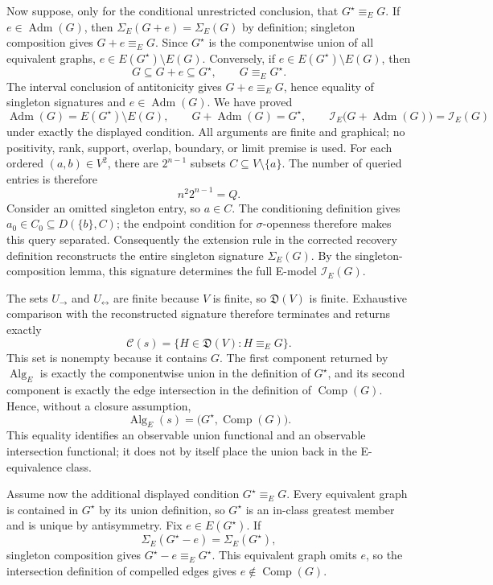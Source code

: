 Now suppose, only for the conditional unrestricted conclusion, that \(G^\star\equiv_EG\).  If \(e\in\operatorname{Adm}(G)\), then \(\Sigma_E(G+e)=\Sigma_E(G)\) by definition; singleton composition gives \(G+e\equiv_EG\).  Since \(G^\star\) is the componentwise union of all equivalent graphs, \(e\in E(G^\star)\setminus E(G)\).  Conversely, if \(e\in E(G^\star)\setminus E(G)\), then
\[
 G\subseteq G+e\subseteq G^\star,
 \qquad G\equiv_EG^\star.
\]
The interval conclusion of antitonicity gives \(G+e\equiv_EG\), hence equality of singleton signatures and \(e\in\operatorname{Adm}(G)\).  We have proved
\[
 \operatorname{Adm}(G)=E(G^\star)\setminus E(G),
 \qquad
 G+\operatorname{Adm}(G)=G^\star,
 \qquad
 \mathcal I_E\bigl(G+\operatorname{Adm}(G)\bigr)=\mathcal I_E(G)
\]
under exactly the displayed condition.  All arguments are finite and graphical; no positivity, rank, support, overlap, boundary, or limit premise is used.
For each ordered \((a,b)\in V^2\), there are \(2^{n-1}\) subsets \(C\subseteq V\setminus\{a\}\).  The number of queried entries is therefore
\[
 n^2 2^{n-1}=Q.
\]
Consider an omitted singleton entry, so \(a\in C\).  The conditioning definition gives \(a_0\in C_0\subseteq D(\{b\},C)\); the endpoint condition for \(\sigma\)-openness therefore makes this query separated.  Consequently the extension rule in the corrected recovery definition reconstructs the entire singleton signature \(\Sigma_E(G)\).  By the singleton-composition lemma, this signature determines the full E-model \(\mathcal I_E(G)\).

The sets \(U_{\to}\) and \(U_{\leftrightarrow}\) are finite because \(V\) is finite, so \(\mathfrak D(V)\) is finite.  Exhaustive comparison with the reconstructed signature therefore terminates and returns exactly
\[
 \mathcal C(s)=\{H\in\mathfrak D(V):H\equiv_EG\}.
\]
This set is nonempty because it contains \(G\).  The first component returned by \(\operatorname{Alg}_E\) is exactly the componentwise union in the definition of \(G^\star\), and its second component is exactly the edge intersection in the definition of \(\operatorname{Comp}(G)\).  Hence, without a closure assumption,
\[
 \operatorname{Alg}_E(s)=\bigl(G^\star,\operatorname{Comp}(G)\bigr).
\]
This equality identifies an observable union functional and an observable intersection functional; it does not by itself place the union back in the E-equivalence class.

Assume now the additional displayed condition \(G^\star\equiv_EG\).  Every equivalent graph is contained in \(G^\star\) by its union definition, so \(G^\star\) is an in-class greatest member and is unique by antisymmetry.  Fix \(e\in E(G^\star)\).  If
\[
 \Sigma_E(G^\star-e)=\Sigma_E(G^\star),
\]
singleton composition gives \(G^\star-e\equiv_EG^\star\).  This equivalent graph omits \(e\), so the intersection definition of compelled edges gives \(e\notin\operatorname{Comp}(G)\).

